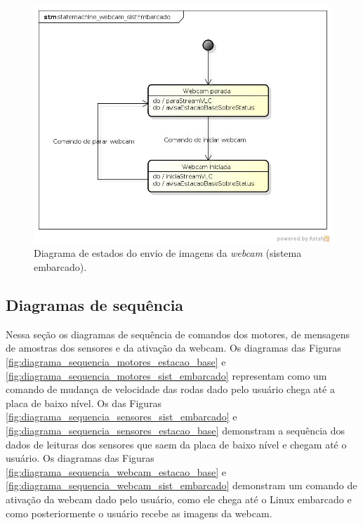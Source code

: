\begin{figure}[H]
  \centering
  \includegraphics[width=\textwidth, keepaspectratio]{./figuras/sistEmbarcado/statemachine_webcam_sistEmbarcado.jpg}
  \caption{Diagrama de estados do envio de imagens da \textit{webcam} (sistema embarcado).}
  \label{fig:diagrama_estados_webcam_sist_embarcado}
\end{figure}



\subsection{Diagramas de sequência}

Nessa seção os diagramas de sequência de comandos dos motores, de mensagens de amostras dos sensores e da ativação da webcam. Os diagramas das Figuras \ref{fig:diagrama_sequencia_motores_estacao_base} e \ref{fig:diagrama_sequencia_motores_sist_embarcado} representam como um comando de mudança de velocidade das rodas dado pelo usuário chega até a placa de baixo nível. Os das Figuras \ref{fig:diagrama_sequencia_sensores_sist_embarcado} e \ref{fig:diagrama_sequencia_sensores_estacao_base} demonstram a sequência dos dados de leituras dos sensores que saem da placa de baixo nível e chegam até o usuário.  Os diagramas das Figuras \ref{fig:diagrama_sequencia_webcam_estacao_base} e \ref{fig:diagrama_sequencia_webcam_sist_embarcado} demonstram um comando de ativação da webcam dado pelo usuário, como ele chega até o Linux embarcado e como posteriormente o usuário recebe as imagens da webcam.

